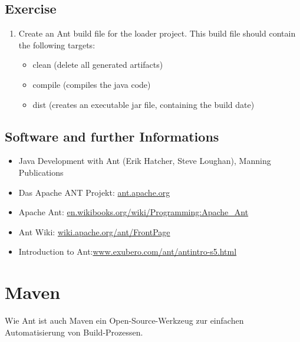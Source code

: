 \subsection{Exercise}
\begin{enumerate}
\item Create an Ant build file for the loader project. This build file
should contain the following targets:
\begin{itemize}
\item clean (delete all generated artifacts)
\item compile (compiles the java code)
\item dist (creates an executable jar file, containing the build date)
\end{itemize}

\end{enumerate}
%
\newslide
\subsection{Software and further Informations}
\begin{itemize}
\item Java Development with Ant (Erik Hatcher, Steve Loughan), Manning
  Publications
\item Das Apache ANT Projekt:
  \href{http://ant.apache.org}{ant.apache.org}
\item Apache Ant:
  \href{http://en.wikibooks.org/wiki/Programming:Apache_Ant}
     {en.wikibooks.org/wiki/Programming:Apache\_Ant}
\item Ant Wiki:
  \href{http://wiki.apache.org/ant/FrontPage}{wiki.apache.org/ant/FrontPage}
\item Introduction to
  Ant:\href{http://www.exubero.com/ant/antintro-s5.html}
{www.exubero.com/ant/antintro-s5.html}
\end{itemize}
%
\newslide
%
%

\newpage

\section{Maven}
Wie Ant ist auch Maven ein Open-Source-Werkzeug zur einfachen Automatisierung von
Build-Prozessen.

